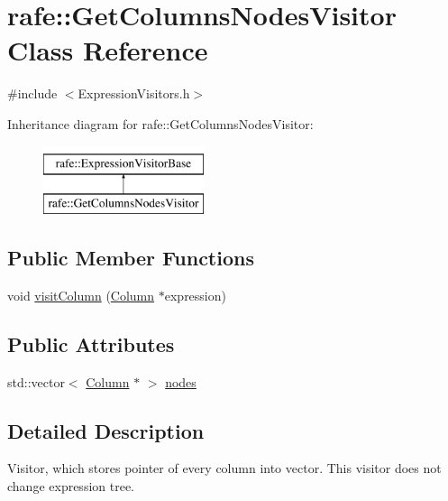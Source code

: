 \hypertarget{classrafe_1_1_get_columns_nodes_visitor}{\section{rafe\+:\+:Get\+Columns\+Nodes\+Visitor Class Reference}
\label{classrafe_1_1_get_columns_nodes_visitor}
}


{\ttfamily \#include $<$Expression\+Visitors.\+h$>$}

Inheritance diagram for rafe\+:\+:Get\+Columns\+Nodes\+Visitor\+:\begin{figure}[H]
\begin{center}
\leavevmode
\includegraphics[height=2.000000cm]{classrafe_1_1_get_columns_nodes_visitor}
\end{center}
\end{figure}
\subsection*{Public Member Functions}
\begin{DoxyCompactItemize}
\item 
void \hyperlink{classrafe_1_1_get_columns_nodes_visitor_a60dd06cf2b318397476a9eba5e32a078}{visit\+Column} (\hyperlink{classrafe_1_1_column}{Column} $\ast$expression)
\end{DoxyCompactItemize}
\subsection*{Public Attributes}
\begin{DoxyCompactItemize}
\item 
std\+::vector$<$ \hyperlink{classrafe_1_1_column}{Column} $\ast$ $>$ \hyperlink{classrafe_1_1_get_columns_nodes_visitor_a33e85438a4b6d2474edb7ba51732c773}{nodes}
\end{DoxyCompactItemize}


\subsection{Detailed Description}
Visitor, which stores pointer of every column into vector. This visitor does not change expression tree. 

